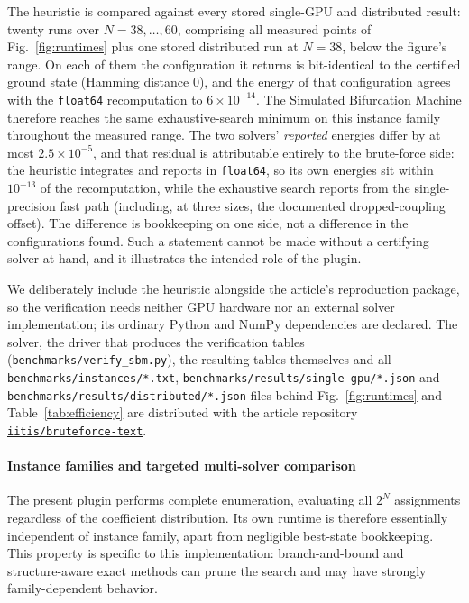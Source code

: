 \documentclass[12pt,a4paper]{elsarticle}
\newcommand{\datarepo}{https://github.com/iitis/bruteforce-text}
\newcommand{\datareponame}{\texttt{iitis/bruteforce-text}}
\begin{document}
The heuristic is compared against every stored single-GPU and distributed result: twenty runs
over $N=38,\dots,60$, comprising all measured points of Fig.~\ref{fig:runtimes} plus one stored
distributed run at $N=38$, below the figure's range. On each of them the configuration it returns is bit-identical to the
certified ground state (Hamming distance $0$), and the energy of that configuration agrees
with the \texttt{float64} recomputation to $6\times 10^{-14}$. The Simulated Bifurcation
Machine therefore reaches the same exhaustive-search minimum on this instance family throughout the
measured range. The two solvers' \emph{reported} energies differ by at most
$2.5\times 10^{-5}$, and that residual is attributable entirely to the brute-force side: the
heuristic integrates and reports in \texttt{float64}, so its own energies sit
within $10^{-13}$ of the recomputation, while the exhaustive search reports from the
single-precision fast path (including, at three sizes, the documented dropped-coupling
offset). The difference is bookkeeping on one side, not a
difference in the configurations found. Such a statement cannot be made without
a certifying solver at hand, and it illustrates the intended role of the plugin.

We deliberately include the heuristic alongside the article's reproduction package, so
the verification needs neither GPU hardware nor an external
solver implementation; its ordinary Python and NumPy dependencies are declared. The solver,
 the driver that produces the verification tables
(\texttt{benchmarks/verify\_sbm.py}), the resulting tables themselves and all
\texttt{benchmarks/instances/*.txt}, \texttt{benchmarks/results/single-gpu/*.json} and
\texttt{benchmarks/results/distributed/*.json} files behind Fig.~\ref{fig:runtimes} and
Table~\ref{tab:efficiency} are distributed with the article
repository \href{\datarepo}{\datareponame}.

\paragraph{Instance families and targeted multi-solver comparison}
The present plugin performs complete enumeration, evaluating all $2^{N}$ assignments
regardless of the coefficient distribution. Its own runtime is therefore essentially
independent of instance family, apart from negligible best-state bookkeeping. This property is
specific to this implementation: branch-and-bound and structure-aware exact methods can prune
the search and may have strongly family-dependent behavior.
\end{document}

